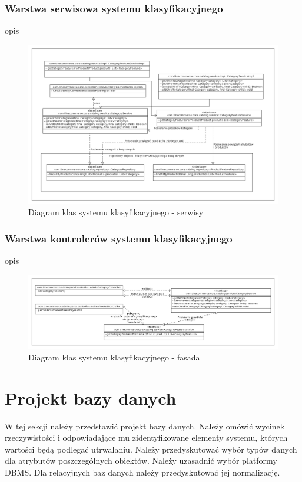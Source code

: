 \subsubsection{Warstwa serwisowa systemu klasyfikacyjnego}
opis
\begin{figure}[H]
	\begin{center}
		\includegraphics[scale=0.4,angle=270]{klasy_serwisy_sysKlas.png}
	\end{center}
	\caption{{\color{black}Diagram klas systemu klasyfikacyjnego - serwisy}} \label{klasy_serwisy_sysKlas}
\end{figure}

\subsubsection{Warstwa kontrolerów systemu klasyfikacyjnego}
opis
\begin{figure}[H]
	\begin{center}
		\includegraphics[scale=0.4,angle=270]{klasy_kontrolery_sysKlas.png}
	\end{center}
	\caption{{\color{black}Diagram klas systemu klasyfikacyjnego - fasada}} \label{klasy_kontrolery_sysKlas}
\end{figure}

\section{Projekt bazy danych}

W tej sekcji należy przedstawić projekt bazy danych. Należy omówić wycinek rzeczywistości i odpowiadające mu zidentyfikowane elementy systemu, których wartości będą podlegać utrwalaniu. Należy przedyskutować wybór typów danych dla atrybutów poszczególnych obiektów. Należy uzasadnić wybór platformy DBMS. Dla relacyjnych baz danych należy przedyskutować jej normalizację.


